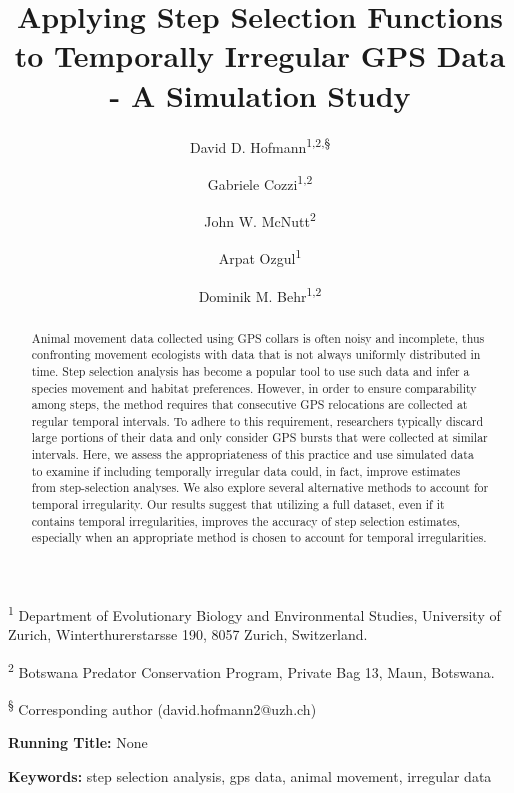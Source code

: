 \documentclass[abstract=on,10pt,a4paper,bibliography=totocnumbered]{article}
\title{Applying Step Selection Functions to Temporally Irregular GPS Data - A
Simulation Study}
\author{
  David D. Hofmann\textsuperscript{1,2,\S} \orcid{0000-0003-3477-4365} \and
  Gabriele Cozzi\textsuperscript{1,2} \orcid{0000-0002-1744-1940} \and
  John W. McNutt\textsuperscript{2} \and
  Arpat Ozgul\textsuperscript{1} \orcid{0000-0001-7477-2642} \and
  Dominik M. Behr\textsuperscript{1,2} \orcid{0000-0001-7378-8538}
}
\begin{document}



\maketitle

\begin{flushleft}

\vspace{0.5cm}

\textsuperscript{1} Department of Evolutionary Biology and Environmental
Studies, University of Zurich, Winterthurerstarsse 190, 8057 Zurich,
Switzerland.

\textsuperscript{2} Botswana Predator Conservation Program, Private Bag 13,
Maun, Botswana.

\textsuperscript{\S} Corresponding author (david.hofmann2@uzh.ch)

\vspace{4cm}

\textbf{Running Title:} None

\vspace{0.5cm}

\textbf{Keywords:} step selection analysis, gps data, animal movement, irregular
data

\end{flushleft}

\newpage
\begin{abstract}
Animal movement data collected using GPS collars is often noisy and incomplete,
thus confronting movement ecologists with data that is not always uniformly
distributed in time. Step selection analysis has become a popular tool to use
such data and infer a species movement and habitat preferences. However, in
order to ensure comparability among steps, the method requires that consecutive
GPS relocations are collected at regular temporal intervals. To adhere to this
requirement, researchers typically discard large portions of their data and only
consider GPS bursts that were collected at similar intervals. Here, we assess
the appropriateness of this practice and use simulated data to examine if
including temporally irregular data could, in fact, improve estimates from
step-selection analyses. We also explore several alternative methods to account
for temporal irregularity. Our results suggest that utilizing a full dataset,
even if it contains temporal irregularities, improves the accuracy of step
selection estimates, especially when an appropriate method is chosen to account
for temporal irregularities.
\end{abstract}
\end{document}
